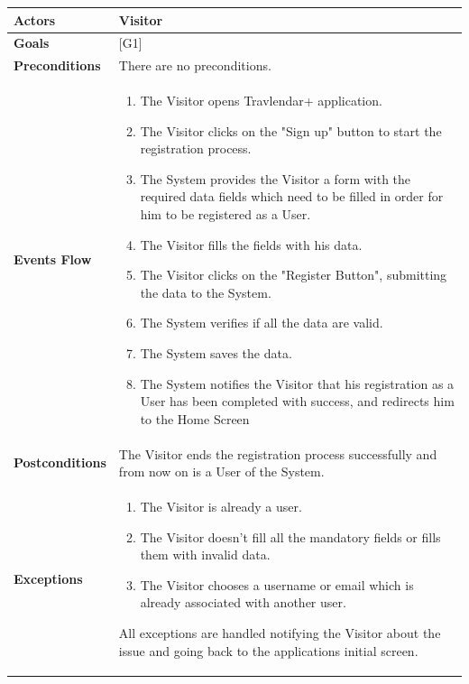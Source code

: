 \documentclass[12pt]{article}
\begin{document}
\begin{center}
    \begin{tabular} { |p{}|p{}| }
        \hline
        \textbf{Actors} & Visitor \\ 
        \hline
        \textbf{Goals} & {[G1]} \\ 
        \hline  
        \textbf{Preconditions} & There are no preconditions. \\ 
        \hline
        \textbf{Events Flow} & \begin{enumerate}[topsep=0pt]
                            \setlength{\itemsep}{0.5pt}
                            \item The Visitor opens Travlendar+ application.
                            \item The Visitor clicks on the "Sign up" button to start the registration process.
                            \item The System provides the Visitor a form with the required data fields which need to be filled in order for him to be registered as a User.
                            \item The Visitor fills the fields with his data. 
                            \item The Visitor clicks on the "Register Button", submitting the data to the System.
                            \item The System verifies if all the data are valid.
                            \item The System saves the data.
                            \item The System notifies the Visitor that his registration as a User has been completed with success, and redirects him to the Home Screen
                            \end{enumerate} \\
        \hline
        \textbf{Postconditions} & The Visitor ends the registration process successfully and from now on is a User of the System. \\
        \hline
        \textbf{Exceptions} & \begin{enumerate}[topsep=0pt]
                            \setlength{\itemsep}{0.5pt}
                            \item The Visitor is already a user. 
                            \item The Visitor doesn't fill all the mandatory fields or fills them with invalid data.
                            \item The Visitor chooses a username or email which is already associated with another user.
                            \end{enumerate} 
                            All exceptions are handled notifying the Visitor about the issue and going back to the applications initial screen.\\ 
        \hline
    \end{tabular}
\end{center}
\end{document}
